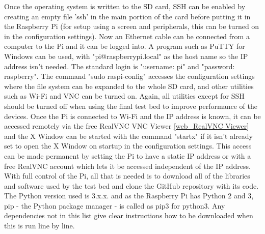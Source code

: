 \documentclass[../main.tex]{subfiles}
\begin{document}
Once the operating system is written to the SD card, SSH can be enabled by creating an empty file 'ssh' in the main portion of the card before putting it in the Raspberry Pi (for setup using a screen and peripherals, this can be turned on in the configuration settings).
Now an Ethernet cable can be connected from a computer to the Pi and it can be logged into.
A program such as PuTTY for Windows can be used, with "pi@raspberrypi.local" as the host name so the IP address isn't needed.
The standard login is "username: pi" and "password: raspberry".
The command "sudo raspi-config" accesses the configuration settings where the file system can be expanded to the whole SD card, and other utilities such as Wi-Fi and VNC can be turned on.
Again, all utilities except for SSH should be turned off when using the final test bed to improve performance of the devices.
Once the Pi is connected to Wi-Fi and the IP address is known, it can be accessed remotely via the free RealVNC VNC Viewer \ref{web_RealVNC Viewer} and the X Window can be started with the command "startx" if it isn't already set to open the X Window on startup in the configuration settings.
This access can be made permanent by setting the Pi to have a static IP address or with a free RealVNC account which lets it be accessed independent of the IP address.\\

With full control of the Pi, all that is needed is to download all of the libraries and software used by the test bed and clone the GitHub repository with its code.
The Python version used is 3.x.x.
and as the Raspberry Pi has Python 2 and 3, pip - the Python package manager - is called as pip3 for python3.
Any dependencies not in this list give clear instructions how to be downloaded when this is run line by line.\\
\end{document}
